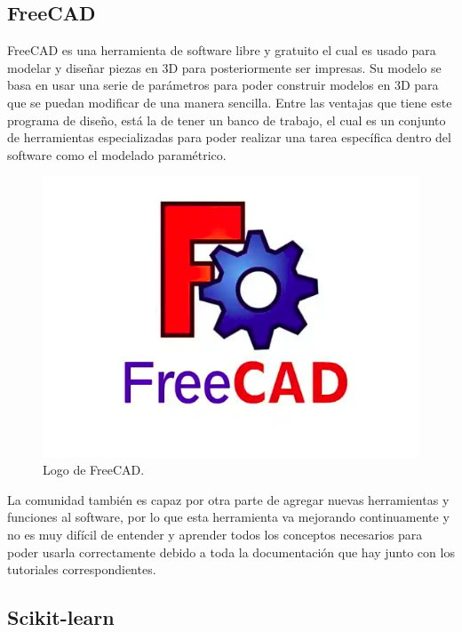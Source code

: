 \subsection{FreeCAD}
\label{subsec:freecad}


FreeCAD es una herramienta de software libre y gratuito el cual es usado para modelar y diseñar piezas en 3D para posteriormente ser impresas. Su modelo se basa en usar una serie de parámetros para poder construir modelos en 3D para que se puedan modificar de una manera sencilla. Entre las ventajas que tiene este programa de diseño, está la de tener un banco de trabajo, el cual es un conjunto de herramientas especializadas para poder realizar una tarea específica dentro del software como el modelado paramétrico. 


\begin{figure}[H]
  \centering
  \includegraphics[scale=0.3]{figs/freecad} %
  \caption{Logo de FreeCAD.}
  \label{fig:freecad}
\end{figure}


La comunidad también es capaz por otra parte de agregar nuevas herramientas y funciones al software, por lo que esta herramienta va mejorando continuamente y no es muy difícil de entender y aprender todos los conceptos necesarios para poder usarla correctamente debido a toda la documentación que hay junto con los tutoriales correspondientes.


\subsection{Scikit-learn}
\label{subsec:sklearn}


